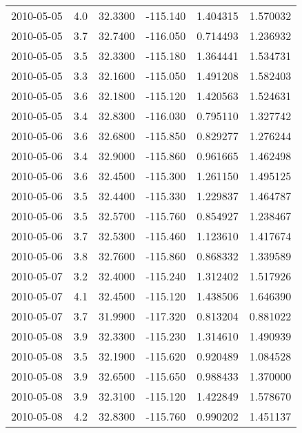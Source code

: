 \begin{tabular}{lrrrrr}
2010-05-05 &       4.0 &  32.3300 &  -115.140 &         1.404315 &         1.570032 \\
2010-05-05 &       3.7 &  32.7400 &  -116.050 &         0.714493 &         1.236932 \\
2010-05-05 &       3.5 &  32.3300 &  -115.180 &         1.364441 &         1.534731 \\
2010-05-05 &       3.3 &  32.1600 &  -115.050 &         1.491208 &         1.582403 \\
2010-05-05 &       3.6 &  32.1800 &  -115.120 &         1.420563 &         1.524631 \\
2010-05-05 &       3.4 &  32.8300 &  -116.030 &         0.795110 &         1.327742 \\
2010-05-06 &       3.6 &  32.6800 &  -115.850 &         0.829277 &         1.276244 \\
2010-05-06 &       3.4 &  32.9000 &  -115.860 &         0.961665 &         1.462498 \\
2010-05-06 &       3.6 &  32.4500 &  -115.300 &         1.261150 &         1.495125 \\
2010-05-06 &       3.5 &  32.4400 &  -115.330 &         1.229837 &         1.464787 \\
2010-05-06 &       3.5 &  32.5700 &  -115.760 &         0.854927 &         1.238467 \\
2010-05-06 &       3.7 &  32.5300 &  -115.460 &         1.123610 &         1.417674 \\
2010-05-06 &       3.8 &  32.7600 &  -115.860 &         0.868332 &         1.339589 \\
2010-05-07 &       3.2 &  32.4000 &  -115.240 &         1.312402 &         1.517926 \\
2010-05-07 &       4.1 &  32.4500 &  -115.120 &         1.438506 &         1.646390 \\
2010-05-07 &       3.7 &  31.9900 &  -117.320 &         0.813204 &         0.881022 \\
2010-05-08 &       3.9 &  32.3300 &  -115.230 &         1.314610 &         1.490939 \\
2010-05-08 &       3.5 &  32.1900 &  -115.620 &         0.920489 &         1.084528 \\
2010-05-08 &       3.9 &  32.6500 &  -115.650 &         0.988433 &         1.370000 \\
2010-05-08 &       3.9 &  32.3100 &  -115.120 &         1.422849 &         1.578670 \\
2010-05-08 &       4.2 &  32.8300 &  -115.760 &         0.990202 &         1.451137 \\

\end{tabular}
